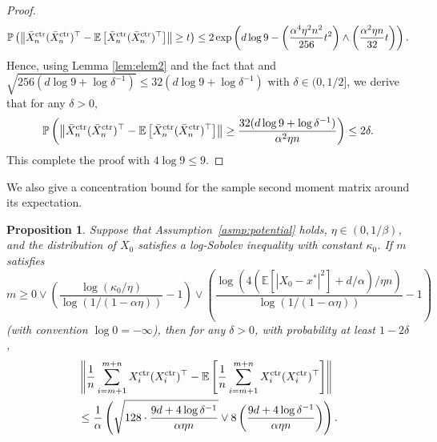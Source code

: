 \documentclass[12pt,reqno]{amsart}
\newtheorem{proposition}[theorem]{Proposition}
\theoremstyle{remark}
\theoremstyle{definition}
\newcommand{\E}{\mathbb{E}}
\renewcommand{\Pr}{\mathbb{P}}
\newcommand{\ctr}{\textnormal{ctr}}
\begin{document}
\begin{proof}
    \begin{equation*}
        \Pr\left(\left\|\bar{X}_{n}^{\ctr}(\bar{X}_{n}^{\ctr})^{\top}-\E\left[\bar{X}_{n}^{\ctr}(\bar{X}_{n}^{\ctr})^{\top}\right]\right\|\ge t\right)\le 2\exp\left(d\log 9 -  \left(\frac{\alpha^{4}\eta^{2} n^{2}}{256} t^{2}\right)\wedge\left(\frac{\alpha^{2}\eta n}{32}t\right)\right).
    \end{equation*}
    Hence, using Lemma \ref{lem:elem2} and the fact that and $\sqrt{256(d\log 9+\log\delta^{-1})}\le 32(d\log 9+\log\delta^{-1})$ with $\delta\in(0,1/2]$, we derive that for any $\delta>0$,
    \begin{align*}
        \Pr\left(\left\|\bar{X}_{n}^{\ctr}(\bar{X}_{n}^{\ctr})^{\top}-\E\left[\bar{X}_{n}^{\ctr}(\bar{X}_{n}^{\ctr})^{\top}\right]\right\|\ge \frac{32 (d\log9+\log\delta^{-1})}{\alpha^{2}\eta n}\right)
        \le 2\delta.
    \end{align*}
    This complete the proof with $4\log9\le 9$.
\end{proof}

We also give a concentration bound for the sample second moment matrix around its expectation.
\begin{proposition}\label{prop:second}
    Suppose that Assumption~\ref{asmp:potential} holds, $\eta\in(0,1/\beta)$, and the distribution of $X_{0}$ satisfies a log-Sobolev inequality with constant $\kappa_{0}$.
    If $m$ satisfies
    \begin{equation*}
        m\ge 0\vee\left(\frac{\log(\kappa_{0}/\eta)}{\log(1/(1-\alpha\eta))}-1\right)\vee \left(\frac{\log(4(\E[|X_{0}-x^{\ast}|^{2}]+d/\alpha)/\eta n)}{\log(1/(1-\alpha\eta))}-1\right)
    \end{equation*}
    (with convention $\log0=-\infty$), then for any $\delta>0$, with probability at least $1-2\delta$,
    \begin{align*}
        &\left\|\frac{1}{n}\sum_{i=m+1}^{m+n}X_{i}^{\ctr}(X_{i}^{\ctr})^{\top}-\E\left[\frac{1}{n}\sum_{i=m+1}^{m+n}X_{i}^{\ctr}(X_{i}^{\ctr})^{\top}\right]\right\|\\
        &\le \frac{1}{\alpha}\left(\sqrt{128\cdot \frac{9d+4\log\delta^{-1}}{\alpha\eta n}}\vee 8\left(\frac{9 d+4\log\delta^{-1}}{\alpha\eta n}\right)\right).
    \end{align*}
\end{proposition}
\end{document}
